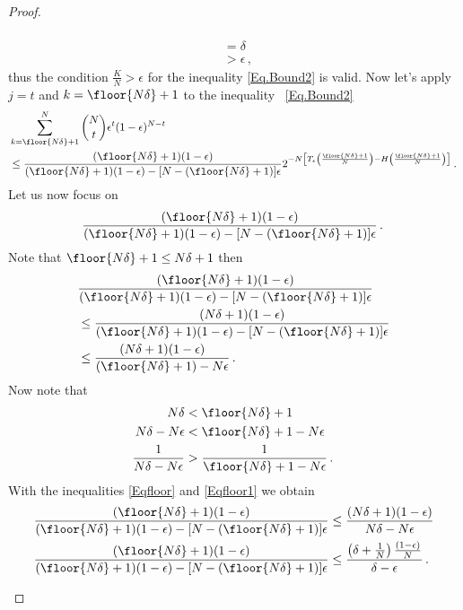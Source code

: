 \begin{proof}
\begin{itemize}
\begin{enumerate}
\begin{align}
    \nonumber\\
    &=\delta
    \nonumber\\
    \nonumber
    &>\epsilon \,,\,
\end{align}
thus the condition $\frac{K}{N}>\epsilon$ for the inequality \eqref{Eq.Bound2} is valid.
Now let's apply $j=t$ and $k=\floor{N\delta}+1$ to the inequality ~\eqref{Eq.Bound2} 
\begin{align}
    & \sum_{k=\floor{N\delta}+1}^{N} \binom{N}{t} \epsilon^t (1-\epsilon)^{N-t}
    \nonumber\\
    & \leq \frac{(\floor{N\delta}+1)(1-\epsilon)}{(\floor{N\delta}+1) (1-\epsilon)-[N-(\floor{N\delta}+1)]\epsilon}
    2^{-N\left[T_\epsilon\left(\frac{\floor{N\delta}+1}{N}\right)-H\left(\frac{\floor{N\delta}+1}{N}\right)\right]} \,.\,
\end{align}
Let us now focus on
\begin{align}
    \frac{(\floor{N\delta}+1)(1-\epsilon)}{(\floor{N\delta}+1) (1-\epsilon)-[N-(\floor{N\delta}+1)]\epsilon}\,.\,
\end{align}
Note that $\floor{N\delta}+1\leq N\delta+1$ then 
\begin{align}
\label{Eqfloor1}
    & \frac{(\floor{N\delta}+1)(1-\epsilon)}{(\floor{N\delta}+1) (1-\epsilon)-[N-(\floor{N\delta}+1)]\epsilon} 
    \nonumber\\
    & \leq \frac{(N\delta+1)(1-\epsilon)}{(\floor{N\delta}+1) (1-\epsilon)-[N-(\floor{N\delta}+1)]\epsilon}
    \nonumber\\
    & \leq \frac{(N\delta+1)(1-\epsilon)}{(\floor{N\delta}+1) - N\epsilon}\,.\,
\end{align}
Now note that 
\begin{align}
\label{Eqfloor}
    N\delta &< \floor{N\delta}+1
    \nonumber\\
    N\delta - N\epsilon &< \floor{N\delta}+1 -N\epsilon
    \nonumber\\
   \frac{1}{N\delta - N\epsilon} &> \frac{1}{\floor{N\delta}+1 -N\epsilon}\,.\,
\end{align}
With the inequalities \eqref{Eqfloor} and \eqref{Eqfloor1} we obtain 
\begin{align}
\label{upperboundtype1}
\frac{(\floor{N\delta}+1)(1-\epsilon)}{(\floor{N\delta}+1) (1-\epsilon)-[N-(\floor{N\delta}+1)]\epsilon} & \leq \frac{(N\delta+1)(1-\epsilon)}{N\delta - N\epsilon}
\nonumber\\
\frac{(\floor{N\delta}+1)(1-\epsilon)}{(\floor{N\delta}+1) (1-\epsilon)-[N-(\floor{N\delta}+1)]\epsilon} & \leq \frac{\left(\delta+\frac{1}{N}\right)\frac{(1-\epsilon)}{N}}{\delta - \epsilon}\,.\,

\end{align}
\end{enumerate}
\end{itemize}
\end{proof}
